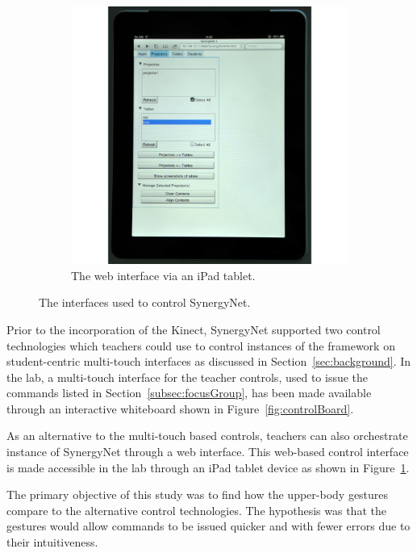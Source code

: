 \documentclass[link]{IWCOMP}
\begin{document}
\begin{figure}[h]
\begin{subfigure}[h]{0.23\textwidth}
		\includegraphics[width=\textwidth]{figures/control_tablet.png}
		\caption{The web interface via an iPad tablet.}
		\label{fig:controlTablet}
	\end{subfigure}
   	\caption{The interfaces used to control SynergyNet.}
   	\label{fig:controlDevices}
\end{figure} 

Prior to the incorporation of the Kinect, SynergyNet supported two control technologies which teachers could use to control instances of the framework on student-centric multi-touch interfaces as discussed in Section~\ref{sec:background}.
In the lab, a multi-touch interface for the teacher controls, used to issue the commands listed in Section~\ref{subsec:focusGroup}, has been made available through an interactive whiteboard shown in Figure~\ref{fig:controlBoard}.

As an alternative to the multi-touch based controls, teachers can also orchestrate instance of SynergyNet through a web interface.
This web-based control interface is made accessible in the lab through an iPad tablet device as shown in Figure~\ref{fig:controlTablet}.

The primary objective of this study was to find how the upper-body gestures compare to the alternative control technologies.
The hypothesis was that the gestures would allow commands to be issued quicker and with fewer errors due to their intuitiveness.
\end{document}

